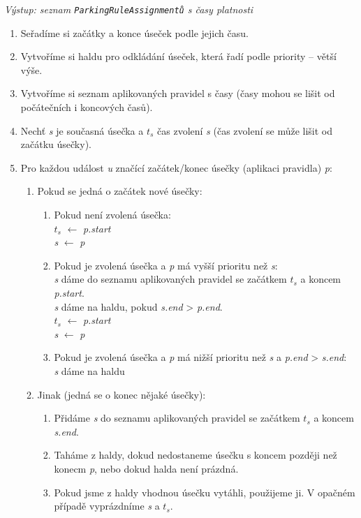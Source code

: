 \textit{Výstup: seznam \texttt{ParkingRuleAssignmentů} s časy platnosti}
\begin{enumerate}
  \setlength\itemsep{.05em}
  \item Seřadíme si začátky a konce úseček podle jejich času.
  \item Vytvoříme si haldu pro odkládání úseček, která řadí podle priority -- větší výše.
  \item Vytvoříme si seznam aplikovaných pravidel s časy (časy mohou se lišit od počátečních i koncových časů).
  \item Nechť \textit{s} je současná úsečka a \textit{$t_s$} čas zvolení \textit{s} (čas zvolení se může lišit od začátku úsečky).
  \item Pro každou událost \textit{u} značící začátek/konec úsečky (aplikaci pravidla) \textit{p}:
  \begin{enumerate}
    \item Pokud se jedná o začátek nové úsečky:
    \begin{enumerate}
      \item Pokud není zvolená úsečka:\\
            \textit{$t_s$} $\leftarrow$ \textit{p.start}\\
            \textit{s} $\leftarrow$ \textit{p}
      \item Pokud je zvolená úsečka a \textit{p} má vyšší prioritu než \textit{s}:\\
            \textit{s} dáme do seznamu aplikovaných pravidel se začátkem \textit{$t_s$} a koncem \textit{p.start}.\\
            \textit{s} dáme na haldu, pokud \textit{s.end} > \textit{p.end}.\\
            \textit{$t_s$} $\leftarrow$ \textit{p.start}\\
            \textit{s} $\leftarrow$ \textit{p}
      \item Pokud je zvolená úsečka a \textit{p} má nižší prioritu než \textit{s} a \textit{p.end} > \textit{s.end}:\\
            \textit{s} dáme na haldu
    \end{enumerate}
    \item Jinak (jedná se o konec nějaké úsečky):
    \begin{enumerate}
      \item Přidáme \textit{s} do seznamu aplikovaných pravidel se začátkem \textit{$t_s$} a koncem \textit{s.end}.
      \item Taháme z haldy, dokud nedostaneme úsečku s koncem později než konecm \textit{p}, nebo dokud halda není prázdná.
      \item Pokud jsme z haldy vhodnou úsečku vytáhli, použijeme ji. V opačném případě vyprázdníme \textit{s} a \textit{$t_s$}.
    \end{enumerate}
  \end{enumerate}
\end{enumerate}

